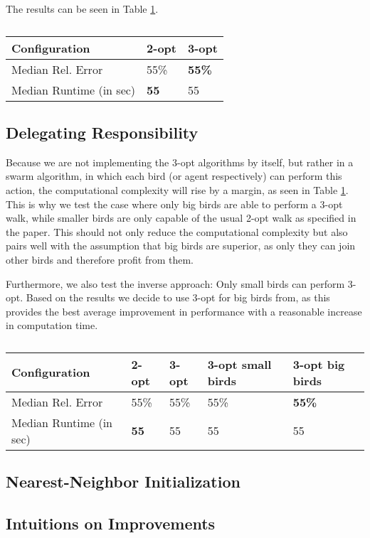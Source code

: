 The results can be seen in Table \ref{3_opt_performance}.

\begin{table}[h!]
\centering
\begin{tabular}{ |p{3cm}||p{0.75cm}|p{0.75cm}|  }
 \hline
 Configuration& 2-opt & 3-opt\\
 \hline \hline
 Median Rel. Error & 55\% & \textbf{55\%}\\
 \hline
 Median Runtime (in sec) & \textbf{55} & 55\\
 \hline
\end{tabular}
\caption{}
\label{3_opt_performance}
\end{table}

\subsection{Delegating Responsibility}

Because we are not implementing the 3-opt algorithms by itself, but rather in a swarm algorithm, in which each bird (or agent respectively) can perform this action, the computational complexity will rise by a margin, as seen in Table \ref{3_opt_performance}. This is why we test the case where only big birds are able to perform a 3-opt walk, while smaller birds are only capable of the usual 2-opt walk as specified in the paper. This should not only reduce the computational complexity but also pairs well with the assumption that big birds are superior, as only they can join other birds and therefore profit from them.

Furthermore, we also test the inverse approach: Only small birds can perform 3-opt.
Based on the results we decide to use 3-opt for big birds from, as this provides the best average improvement in performance with a reasonable increase in computation time.

\begin{table}[h!]
\centering
\begin{tabular}{ |p{3cm}||p{0.75cm}|p{0.75cm}|p{0.75cm}|p{0.75cm}|  }
 \hline
 Configuration& 2-opt & 3-opt & 3-opt small birds & 3-opt big birds\\
 \hline \hline
 Median Rel. Error & 55\% & 55\% & 55\% & \textbf{55\%}\\
 \hline
 Median Runtime (in sec) & \textbf{55} & 55 & 55 & 55\\
 \hline
\end{tabular}
\caption{}
\label{3_opt_big_small_performance}
\end{table}

\subsection{Nearest-Neighbor Initialization}

\subsection{Intuitions on Improvements}